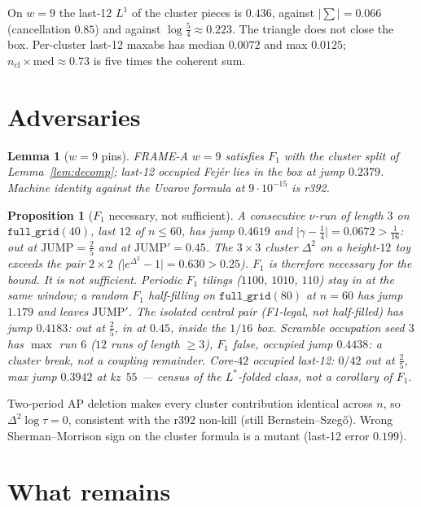 \documentclass[11pt]{article}
\newtheorem{lemma}{Lemma}
\newtheorem{prop}{Proposition}
\theoremstyle{remark}
\begin{document}
On $w=9$ the last-12 $L^1$ of the cluster pieces is $0.436$,
against $\lvert\sum\rvert=0.066$ (cancellation $0.85$) and against
$\log\tfrac54\approx 0.223$.
The triangle does not close the box.
Per-cluster last-12 maxabs has median $0.0072$ and max $0.0125$;
$n_{\mathrm{cl}}\times\mathrm{med}\approx 0.73$ is five times the
coherent sum.

\section{Adversaries}\label{sec:adv}

\begin{lemma}[$w=9$ pins]\label{lem:w9}
FRAME-A $w=9$ satisfies $F_1$ with the cluster split of
Lemma~\ref{lem:decomp}; last-12 occupied Fej\'er lies in the box
at jump $0.2379$.  Machine identity against the Uvarov formula
at $9\cdot10^{-15}$ is r392.
\end{lemma}

\begin{prop}[$F_1$ necessary, not sufficient]\label{prop:f1}
A consecutive $\nu$-run of length $3$ on $\mathtt{full\_grid}(40)$,
last $12$ of $n\le 60$, has jump $0.4619$ and
$\lvert\gamma-\tfrac14\rvert=0.0672>\tfrac1{16}$: out at
$\mathrm{JUMP}=\tfrac25$ and at $\mathrm{JUMP}'=0.45$.
The $3\times3$ cluster $\Delta^2$ on a height-$12$ toy exceeds
the pair $2\times2$ ($\lvert e^{\Delta^2}-1\rvert=0.630>0.25$).
$F_1$ is therefore necessary for the bound.
It is not sufficient.
Periodic $F_1$ tilings ($1100$, $1010$, $110$) stay in at the
same window; a random $F_1$ half-filling on $\mathtt{full\_grid}(80)$
at $n=60$ has jump $1.179$ and leaves $\mathrm{JUMP}'$.
The isolated central pair (F1-legal, not half-filled) has jump
$0.4183$: out at $\tfrac25$, in at $0.45$, inside the $1/16$ box.
Scramble occupation seed $3$ has $\max$ run $6$ ($12$ runs of
length $\ge 3$), $F_1$ false, occupied jump $0.4438$: a cluster
break, not a coupling remainder.
Core-$42$ occupied last-12: $0/42$ out at $\tfrac25$, max jump
$0.3942$ at kz~$55$ --- census of the $L^*$-folded class, not a
corollary of $F_1$.
\end{prop}

Two-period AP deletion makes every cluster contribution identical
across $n$, so $\Delta^2\log\tau=0$, consistent with the r392
non-kill (still Bernstein--Szeg\H{o}).
Wrong Sherman--Morrison sign on the cluster formula is a mutant
(last-12 error $0.199$).

\section{What remains}\label{sec:rest}
\end{document}

